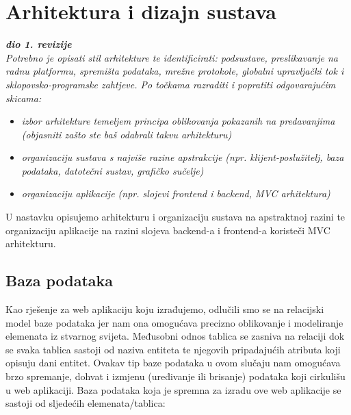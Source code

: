 \chapter{Arhitektura i dizajn sustava}
		
		\textbf{\textit{dio 1. revizije}}\\

		\textit{ Potrebno je opisati stil arhitekture te identificirati: podsustave, preslikavanje na radnu platformu, spremišta podataka, mrežne protokole, globalni upravljački tok i sklopovsko-programske zahtjeve. Po točkama razraditi i popratiti odgovarajućim skicama:}
	\begin{itemize}
		\item 	\textit{izbor arhitekture temeljem principa oblikovanja pokazanih na predavanjima (objasniti zašto ste baš odabrali takvu arhitekturu)}
		\item 	\textit{organizaciju sustava s najviše razine apstrakcije (npr. klijent-poslužitelj, baza podataka, datotečni sustav, grafičko sučelje)}
		\item 	\textit{organizaciju aplikacije (npr. slojevi frontend i backend, MVC arhitektura) }		
	\end{itemize}


		\noindent U nastavku opisujemo arhitekturu i organizaciju sustava na apstraktnoj razini te organizaciju aplikacije na razini slojeva backend-a i frontend-a koristeči MVC arhitekturu.


		\eject
		

		

				
		\section{Baza podataka}
		
		
		\textnormal{Kao rješenje za web aplikaciju koju izrađujemo, odlučili smo se na relacijski model baze podataka jer nam ona omogućava precizno oblikovanje i modeliranje elemenata iz stvarnog svijeta. Međusobni odnos tablica se zasniva na relaciji dok se svaka tablica sastoji od naziva entiteta te njegovih pripadajućih atributa koji opisuju dani entitet. Ovakav tip baze podataka u ovom slučaju nam omogućava brzo spremanje, dohvat i izmjenu (uređivanje ili brisanje) podataka koji cirkulišu u web aplikaciji. Baza podataka koja je spremna za izradu ove web aplikacije se sastoji od sljedećih elemenata/tablica:}
		
